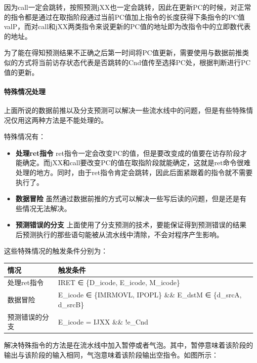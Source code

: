 因为call一定会跳转，按照预测jXX也一定会跳转，因此在更新PC的时候，对正常的指令都是通过在取指阶段通过当前PC值加上指令的长度获得下条指令的PC值valP，而对call和jXX两类指令来说更新的PC值的地址即为改指令中的立即数代表的地址。

为了能在得知预测结果不正确之后第一时间将PC值更新，需要使用与数据前推类似的方式将当前访存状态代表是否跳转的Cnd值传至选择PC处，根据判断进行PC值的更新。

\paragraph{特殊情况处理}\label{ux7279ux6b8aux60c5ux51b5ux5904ux7406}

上面所说的数据前推以及分支预测可以解决一些流水线中的问题，但是有些特殊情况仅用这两种方法是不能处理的。

特殊情况有：

\begin{itemize}
\itemsep1pt\parskip0pt
\item
  \textbf{处理ret指令}
  ret指令一定会改变PC的值，但是要改变成的值要在访存阶段才能确定。而jXX和call要改变PC的值在取指阶段就能确定，这就是ret命令很难处理的地方。同时，由于ret指令肯定会跳转，因此后面紧跟着的指令就不需要执行了。
\item
  \textbf{数据冒险}
  虽然通过数据前推的方式可以解决一些写后读的问题，但是还是有些情况无法解决。
\item
  \textbf{预测错误的分支}
  上面使用了分支预测的技术，要能保证得到预测错误的结果后预测执行的那些语句能被从流水线中清除，不会对程序产生影响。
\end{itemize}

这些特殊情况的触发条件分别为：

\begin{longtable}[c]{@{}ll@{}}
\toprule
情况 & 触发条件\tabularnewline
\midrule
\endhead
处理ret指令 & IRET ∈ \{D\_icode, E\_icode, M\_icode\}\tabularnewline
数据冒险 & E\_icode ∈ \{IMRMOVL, IPOPL\} \&\& E\_dstM ∈ \{d\_srcA,
d\_srcB\}\tabularnewline
预测错误的分支 & E\_icode = IJXX \&\& !e\_Cnd\tabularnewline
\bottomrule
\end{longtable}

解决特殊指令的方法是在流水线中加入暂停或者气泡。其中，暂停意味着该阶段的输出与该阶段的输入相同，气泡意味着该阶段输出空指令。如图所示：

